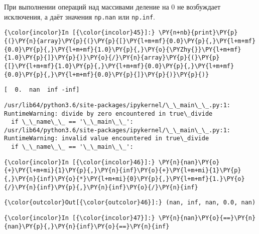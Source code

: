     При выполнении операций над массивами деление на 0 не возбуждает
исключения, а даёт значения \texttt{np.nan} или \texttt{np.inf}.

    \begin{Verbatim}[commandchars=\\\{\}]
{\color{incolor}In [{\color{incolor}45}]:} \PY{n+nb}{print}\PY{p}{(}\PY{n}{array}\PY{p}{(}\PY{p}{[}\PY{l+m+mf}{0.0}\PY{p}{,}\PY{l+m+mf}{0.0}\PY{p}{,}\PY{l+m+mf}{1.0}\PY{p}{,}\PY{o}{\PYZhy{}}\PY{l+m+mf}{1.0}\PY{p}{]}\PY{p}{)}\PY{o}{/}\PY{n}{array}\PY{p}{(}\PY{p}{[}\PY{l+m+mf}{1.0}\PY{p}{,}\PY{l+m+mf}{0.0}\PY{p}{,}\PY{l+m+mf}{0.0}\PY{p}{,}\PY{l+m+mf}{0.0}\PY{p}{]}\PY{p}{)}\PY{p}{)}
\end{Verbatim}

    \begin{Verbatim}[commandchars=\\\{\}]
[  0.  nan  inf -inf]

    \end{Verbatim}

    \begin{Verbatim}[commandchars=\\\{\}]
/usr/lib64/python3.6/site-packages/ipykernel/\_\_main\_\_.py:1: RuntimeWarning: divide by zero encountered in true\_divide
  if \_\_name\_\_ == '\_\_main\_\_':
/usr/lib64/python3.6/site-packages/ipykernel/\_\_main\_\_.py:1: RuntimeWarning: invalid value encountered in true\_divide
  if \_\_name\_\_ == '\_\_main\_\_':

    \end{Verbatim}

    \begin{Verbatim}[commandchars=\\\{\}]
{\color{incolor}In [{\color{incolor}46}]:} \PY{n}{nan}\PY{o}{+}\PY{l+m+mi}{1}\PY{p}{,}\PY{n}{inf}\PY{o}{+}\PY{l+m+mi}{1}\PY{p}{,}\PY{n}{inf}\PY{o}{*}\PY{l+m+mi}{0}\PY{p}{,}\PY{l+m+mf}{1.}\PY{o}{/}\PY{n}{inf}\PY{p}{,}\PY{n}{inf}\PY{o}{/}\PY{n}{inf}
\end{Verbatim}

            \begin{Verbatim}[commandchars=\\\{\}]
{\color{outcolor}Out[{\color{outcolor}46}]:} (nan, inf, nan, 0.0, nan)
\end{Verbatim}
        
    \begin{Verbatim}[commandchars=\\\{\}]
{\color{incolor}In [{\color{incolor}47}]:} \PY{n}{nan}\PY{o}{==}\PY{n}{nan}\PY{p}{,}\PY{n}{inf}\PY{o}{==}\PY{n}{inf}
\end{Verbatim}

